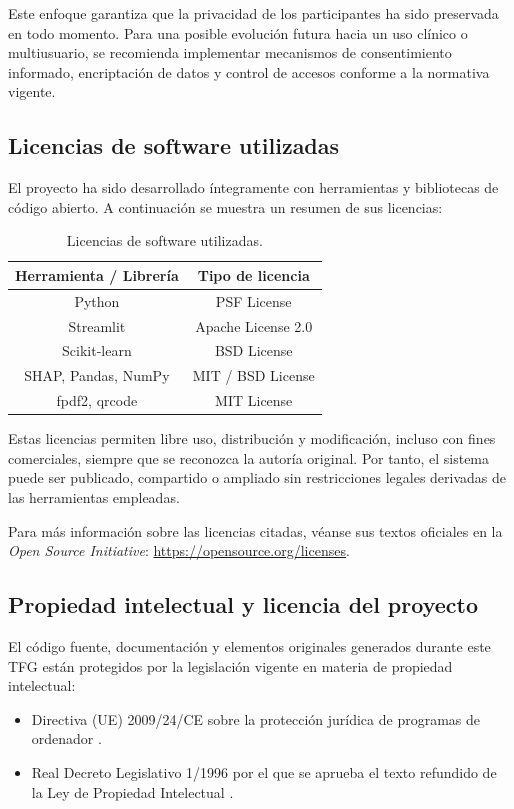Este enfoque garantiza que la privacidad de los participantes ha sido preservada en todo momento. Para una posible evolución futura hacia un uso clínico o multiusuario, se recomienda implementar mecanismos de consentimiento informado, encriptación de datos y control de accesos conforme a la normativa vigente.

\subsection{Licencias de software utilizadas}

El proyecto ha sido desarrollado íntegramente con herramientas y bibliotecas de código abierto. A continuación se muestra un resumen de sus licencias:

\begin{table}[H]
\centering
\begin{tabular}{|c|c|}
\hline
\textbf{Herramienta / Librería} & \textbf{Tipo de licencia} \\
\hline
Python & PSF License \\
Streamlit & Apache License 2.0 \\
Scikit-learn & BSD License \\
SHAP, Pandas, NumPy & MIT / BSD License \\
fpdf2, qrcode & MIT License \\
\hline
\end{tabular}
\caption{Licencias de software utilizadas.}
\end{table}

Estas licencias permiten libre uso, distribución y modificación, incluso con fines comerciales, siempre que se reconozca la autoría original. Por tanto, el sistema puede ser publicado, compartido o ampliado sin restricciones legales derivadas de las herramientas empleadas.

Para más información sobre las licencias citadas, véanse sus textos oficiales en la \textit{Open Source Initiative}: \url{https://opensource.org/licenses}.


\subsection{Propiedad intelectual y licencia del proyecto}

El código fuente, documentación y elementos originales generados durante este TFG están protegidos por la legislación vigente en materia de propiedad intelectual:

\begin{itemize}
  \item Directiva (UE) 2009/24/CE sobre la protección jurídica de programas de ordenador \cite{directiva2009}.
  \item Real Decreto Legislativo 1/1996 por el que se aprueba el texto refundido de la Ley de Propiedad Intelectual \cite{lpi1996}.
\end{itemize}

